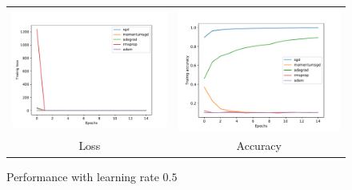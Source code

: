 \documentclass[12pt]{article}
\newcommand{\nnperfw}{7cm}
\begin{document}
\begin{figure}
\centering
\begin{tabular}{cc}
  \includegraphics[width=\nnperfw]{hw2/codes/optimizer/pytorch/results/0_5/loss.pdf} &   \includegraphics[width=\nnperfw]{hw2/codes/optimizer/pytorch/results/0_5/accuracy.pdf} \\
Loss & Accuracy \\[6pt]
\end{tabular}
\caption{Performance with learning rate $0.5$} \label{fig:nn-0-5}
\end{figure}
\end{document}
